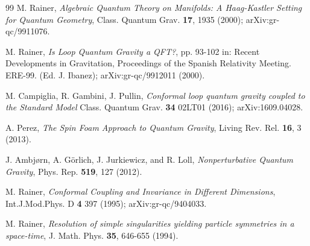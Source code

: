 \documentclass[11pt,a4paper]{article}
\theoremstyle{definition}
\begin{document}
\begin{thebibliography}{99}
		M. Rainer, \emph{Algebraic Quantum Theory on Manifolds: A Haag-Kastler Setting for Quantum Geometry}, Class. Quantum Grav. \textbf{17}, 1935 (2000); arXiv:gr-qc/9911076.
		
		M. Rainer, \emph{Is Loop Quantum Gravity a QFT?}, pp. 93-102 in: Recent Developments in Gravitation, Proceedings of the Spanish Relativity Meeting.  ERE-99. (Ed. J. Ibanez); arXiv:gr-qc/9912011 (2000).
		
		M. Campiglia, R. Gambini, J. Pullin,
		\emph{Conformal loop quantum gravity coupled to the Standard Model}
		Class. Quantum Grav. \textbf{34} 02LT01 (2016); {arXiv:1609.04028}.
		
		A. Perez, \emph{The Spin Foam Approach to Quantum Gravity}, Living Rev. Rel. \textbf{16}, 3 (2013).
		
		J. Ambjørn, A. G\"orlich, J. Jurkiewicz, and R. Loll, \emph{Nonperturbative Quantum Gravity}, Phys. Rep. \textbf{519}, 127 (2012).
		
		M. Rainer, \emph{Conformal Coupling and Invariance in Different Dimensions},
		Int.J.Mod.Phys. D \textbf{4} 397  (1995); arXiv:gr-qc/9404033.
		
		M. Rainer, \emph{Resolution of simple singularities yielding particle symmetries in a space-time}, J. Math. Phys. {\bf 35}, 646-655 (1994).
		
		
		
		
	\end{thebibliography}
	
\end{document}

